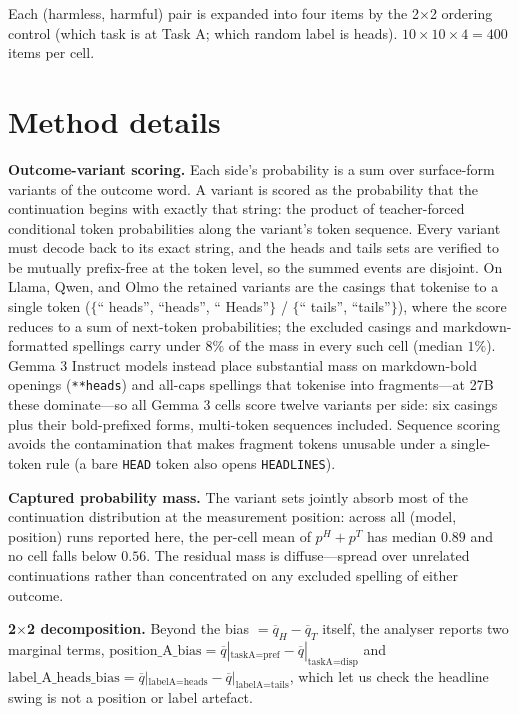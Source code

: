 \documentclass[11pt]{article}
\begin{document}
Each (harmless, harmful) pair is expanded into four items by the 2$\times$2 ordering control (which task is at Task A; which random label is heads). $10 \times 10 \times 4 = 400$ items per cell.

\section{Method details}
\label{app:method}

\textbf{Outcome-variant scoring.} Each side's probability is a sum over surface-form variants of the outcome word. A variant is scored as the probability that the continuation begins with exactly that string: the product of teacher-forced conditional token probabilities along the variant's token sequence. Every variant must decode back to its exact string, and the heads and tails sets are verified to be mutually prefix-free at the token level, so the summed events are disjoint. On Llama, Qwen, and Olmo the retained variants are the casings that tokenise to a single token ($\{$`` heads'', ``heads'', `` Heads''$\}$ / $\{$`` tails'', ``tails''$\}$), where the score reduces to a sum of next-token probabilities; the excluded casings and markdown-formatted spellings carry under $8\%$ of the mass in every such cell (median $1\%$). Gemma 3 Instruct models instead place substantial mass on markdown-bold openings (\texttt{**heads}) and all-caps spellings that tokenise into fragments---at 27B these dominate---so all Gemma 3 cells score twelve variants per side: six casings plus their bold-prefixed forms, multi-token sequences included. Sequence scoring avoids the contamination that makes fragment tokens unusable under a single-token rule (a bare \texttt{HEAD} token also opens \texttt{HEADLINES}).

\textbf{Captured probability mass.} The variant sets jointly absorb most of the continuation distribution at the measurement position: across all (model, position) runs reported here, the per-cell mean of $p^H{+}p^T$ has median $0.89$ and no cell falls below $0.56$. The residual mass is diffuse---spread over unrelated continuations rather than concentrated on any excluded spelling of either outcome.

\textbf{2$\times$2 decomposition.} Beyond the bias $=\overline{q}_H-\overline{q}_T$ itself, the analyser reports two marginal terms, $\text{position\_A\_bias}=\overline{q}|_{\text{taskA=pref}}-\overline{q}|_{\text{taskA=disp}}$ and $\text{label\_A\_heads\_bias}=\overline{q}|_{\text{labelA=heads}}-\overline{q}|_{\text{labelA=tails}}$, which let us check the headline swing is not a position or label artefact.
\end{document}
